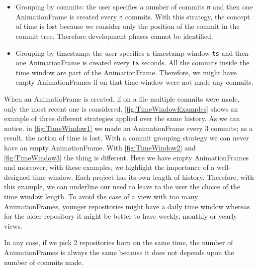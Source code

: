 \begin{itemize}
    \item{Grouping by commits}: the user specifies a number of commits \texttt{n} and then one AnimationFrame is created every \texttt{n} commits. With this strategy, the concept of time is lost because we consider only the position of the commit in the commit tree. Therefore development phases cannot be identified. 
    \item{Grouping by timestamp}: the user specifies a timestamp window \texttt{ts} and then one AnimationFrame is created every \texttt{ts} seconds. All the commits inside the time window are part of the AnimationFrame. Therefore, we might have empty AnimationFrames if on that time window were not made any commits. 
\end{itemize}

When an AnimatioFrame is created, if on a file multiple commits were made, only the most recent one is considered. 
\autoref{fig:TimeWindowExamples} shows an example of three different strategies applied over the same history. As we can notice, in \autoref{fig:TimeWindow1} we made an AnimationFrame every 3 commits; as a result, the notion of time is lost. With a commit grouping strategy we can never have an empty AnimationFrame. With  \autoref{fig:TimeWindow2} and \autoref{fig:TimeWindow3} the thing is different. Here we have empty AnimationFrames and moreover, with these examples, we highlight the importance of a well-designed time window. Each project has its own length of history. Therefore, with this example, we can underline our need to leave to the user the choice of the time window length. To avoid the case of a view with too many AnimationFrames, younger repositories might have a daily time window whereas for the older repository it might be better to have weekly, monthly or yearly views. 

In any case, if we pick 2 repositories born on the same time, the number of AnimationFrames is always the same because it does not depends upon the number of commits made. 


